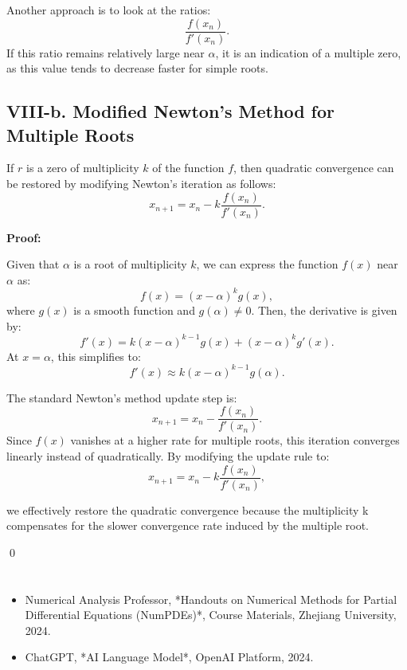 \documentclass[a4paper]{article}
\begin{document}
Another approach is to look at the ratios:
\[
\frac{f(x_n)}{f'(x_n)}.
\]
If this ratio remains relatively large near \( \alpha \), it is an indication of a multiple zero, as this value tends to decrease faster for simple roots.

\subsection*{VIII-b. Modified Newton’s Method for Multiple Roots}

If \( r \) is a zero of multiplicity \( k \) of the function \( f \), then quadratic convergence can be restored by modifying Newton’s iteration as follows:
\[
x_{n+1} = x_n - k \frac{f(x_n)}{f'(x_n)}.
\]

\textbf{Proof:}

Given that \( \alpha \) is a root of multiplicity \( k \), we can express the function \( f(x) \) near \( \alpha \) as:
\[
f(x) = (x - \alpha)^k g(x),
\]
where \( g(x) \) is a smooth function and \( g(\alpha) \neq 0 \). Then, the derivative is given by:
\[
f'(x) = k(x - \alpha)^{k-1} g(x) + (x - \alpha)^k g'(x).
\]
At \( x = \alpha \), this simplifies to:
\[
f'(x) \approx k (x - \alpha)^{k-1} g(\alpha).
\]

The standard Newton’s method update step is:
\[
x_{n+1} = x_n - \frac{f(x_n)}{f'(x_n)}.
\]
Since \( f(x) \) vanishes at a higher rate for multiple roots, this iteration converges linearly instead of quadratically. By modifying the update rule to:
\[
x_{n+1} = x_n - k \frac{f(x_n)}{f'(x_n)},
\]

we effectively restore the quadratic convergence because the multiplicity  k  compensates for the slower convergence rate induced by the multiple root.


\qed
\section*{}

\begin{itemize}
   \item Numerical Analysis Professor, *Handouts on Numerical Methods for Partial Differential Equations (NumPDEs)*, Course Materials, Zhejiang University, 2024.
   \item ChatGPT, *AI Language Model*, OpenAI Platform, 2024.
\end{itemize}
\end{document}
